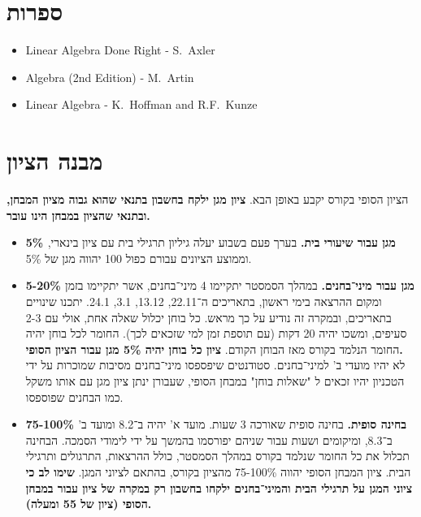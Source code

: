 \documentclass{article}
\begin{document}
\section*{ספרות}
\begin{english}
\begin{itemize}
\item[-] \textenglish{Linear Algebra Done Right - S.~Axler}
\item[-] \textenglish{Algebra (2nd Edition) - M.~Artin}
\item[-] \textenglish{Linear Algebra - K.~Hoffman and R.F.~Kunze}
\end{itemize}
\end{english}

\section*{מבנה הציון}

הציון הסופי בקורס יקבע באופן הבא.
\textbf{
ציון מגן ילקח בחשבון בתנאי שהוא גבוה מציון המבחן, ובתנאי שהציון במבחן הינו עובר.}

\begin{itemize}
\item[-] \textbf{5\% מגן עבור שיעורי בית.}
בערך פעם בשבוע יעלה גיליון תרגילי בית עם ציון בינארי, וממוצע הציונים עבורם כפול 100 יהווה מגן של
5\%.

\item[-] \textbf{5-20\% מגן עבור מיני־בחנים.}
במהלך הסמסטר יתקיימו 4 מיני־בחנים, אשר יתקיימו בזמן ומקום ההרצאה בימי ראשון, בתאריכים ה־22.11, 13.12, 3.1, 24.1. יתכנו שינויים בתאריכים, ובמקרה זה נודיע על כך מראש. כל בוחן יכלול שאלה אחת, אולי עם 2-3 סעיפים, ומשכו יהיה 20 דקות (עם תוספת זמן למי שזכאים לכך). החומר לכל בוחן יהיה החומר הנלמד בקורס מאז הבוחן הקודם.
\textbf{ציון כל בוחן יהיה 5\% מגן עבור הציון הסופי.} \\
לא יהיו מועדי ב' למיני־בחנים. סטודנטים שיפספסו מיני־בחנים מסיבות שמוכרות על ידי הטכניון יהיו זכאים ל%
"שאלות בוחן"
במבחן הסופי, שעבורן ינתן ציון מגן עם אותו משקל כמו הבחנים שפוספסו.

\item[-] \textbf{75-100\% בחינה סופית.}
בחינה סופית שאורכה 3 שעות. מועד א' יהיה ב־8.2 ומועד ב' ב־8.3, ומיקומים ושעות עבור שניהם יפורסמו בהמשך על ידי לימודי הסמכה. הבחינה תכלול את כל החומר שנלמד בקורס במהלך הסמסטר, כולל ההרצאות, התרגולים ותרגילי הבית. ציון המבחן הסופי יהווה 75-100\% מהציון בקורס, בהתאם לציוני המגן.
\textbf{שימו לב כי ציוני המגן על תרגילי הבית והמיני־בחנים ילקחו בחשבון רק במקרה של ציון עבור במבחן הסופי (ציון של 55 ומעלה).}
\end{itemize}
\end{document}
